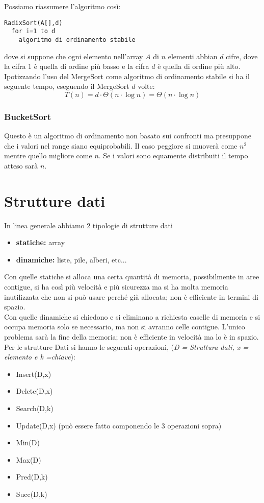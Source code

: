 \documentclass[a4paper,12pt,oneside,tikz]{book}
\begin{document}
Possiamo riassumere l'algoritmo così:
\begin{verbatim}
RadixSort(A[],d)
  for i=1 to d
    algoritmo di ordinamento stabile
\end{verbatim}
dove si suppone che ogni elemento nell'array $A$ di $n$ elementi abbian $d$ cifre, dove la cifra $1$ è quella di ordine più basso e la cifra $d$ è quella di ordine più alto.\\
Ipotizzando l'uso del MergeSort come algoritmo di ordinamento stabile si ha il seguente tempo, eseguendo il MergeSort $d$ volte:
$$T(n)=d\cdot \Theta(n\cdot\log n)=\Theta(n\cdot \log n)$$

\subsection{BucketSort}
Questo è un algoritmo di ordinamento non basato sui confronti ma presuppone che i valori nel range siano equiprobabili. Il caso peggiore si muoverà come $n^2$ mentre quello migliore come $n$. Se i valori sono equamente distribuiti il tempo atteso sarà $n$.

\chapter{Strutture dati}
In linea generale abbiamo 2 tipologie di strutture dati
\begin{itemize}
	\item \textbf{statiche:} array
	\item \textbf{dinamiche:} liste, pile, alberi, etc...
\end{itemize}
Con quelle statiche si alloca una certa quantità di memoria, possibilmente in aree contigue, si ha così più velocità e più sicurezza ma si ha molta memoria inutilizzata che non si può usare perché già allocata; non è efficiente in termini di spazio.\\
Con quelle dinamiche si chiedono e si eliminano a richiesta caselle di memoria e si occupa memoria solo se necessario, ma non si avranno celle contigue. L'unico problema sarà la fine della memoria; non è efficiente in velocità ma lo è in spazio.
\newpage
Per le strutture Dati si hanno le seguenti operazioni, (\textit{D = Struttura dati, x = elemento e k =chiave}):
\begin{itemize}
	\item Insert(D,x)
	\item Delete(D,x)
	\item Search(D,k)
	\item Update(D,x) (può essere fatto componendo le 3 operazioni sopra)
	\item Min(D)
	\item Max(D)
	\item Pred(D,k)
	\item Succ(D,k)
\end{itemize}
\end{document}
